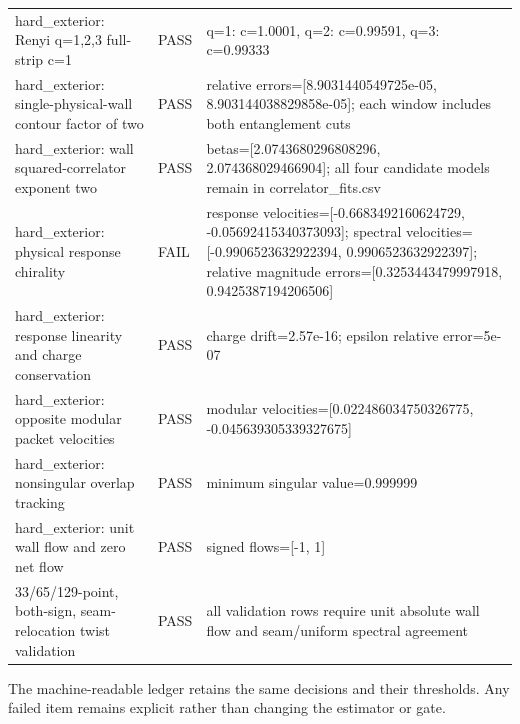 \documentclass[aps,prb,onecolumn,nofootinbib,superscriptaddress]{revtex4-2}
\begin{document}
\begin{longtable}{p{}p{}p{}}
hard\_exterior: Renyi q=1,2,3 full-strip c=1 & PASS & q=1: c=1.0001, q=2: c=0.99591, q=3: c=0.99333 \\
hard\_exterior: single-physical-wall contour factor of two & PASS & relative errors=[8.9031440549725e-05, 8.903144038829858e-05]; each window includes both entanglement cuts \\
hard\_exterior: wall squared-correlator exponent two & PASS & betas=[2.0743680296808296, 2.074368029466904]; all four candidate models remain in correlator\_fits.csv \\
hard\_exterior: physical response chirality & FAIL & response velocities=[-0.6683492160624729, -0.05692415340373093]; spectral velocities=[-0.9906523632922394, 0.9906523632922397]; relative magnitude errors=[0.3253443479997918, 0.9425387194206506] \\
hard\_exterior: response linearity and charge conservation & PASS & charge drift=2.57e-16; epsilon relative error=5e-07 \\
hard\_exterior: opposite modular packet velocities & PASS & modular velocities=[0.022486034750326775, -0.045639305339327675] \\
hard\_exterior: nonsingular overlap tracking & PASS & minimum singular value=0.999999 \\
hard\_exterior: unit wall flow and zero net flow & PASS & signed flows=[-1, 1] \\
33/65/129-point, both-sign, seam-relocation twist validation & PASS & all validation rows require unit absolute wall flow and seam/uniform spectral agreement \\
\bottomrule
\end{longtable}
The machine-readable ledger retains the same decisions and their thresholds.  Any failed
item remains explicit rather than changing the estimator or gate.
\end{document}
